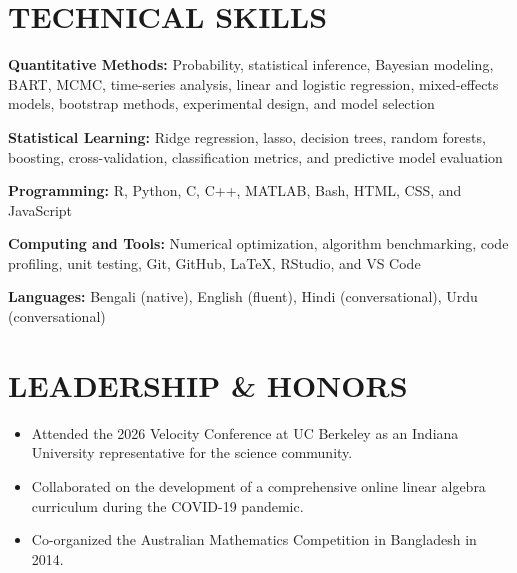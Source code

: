 \documentclass[10pt,letterpaper]{article}
\newenvironment{resumeItems}{%
	\begin{itemize}[
		label=\textbullet,
		leftmargin=14pt,
		labelsep=5pt,
		itemsep=0.5pt,
		topsep=1.0pt,
		parsep=0pt,
		partopsep=0pt
	]
}{%
	\end{itemize}
}
\begin{document}
\section*{TECHNICAL SKILLS}

\textbf{Quantitative Methods:}
Probability, statistical inference, Bayesian modeling, BART, MCMC, time-series analysis, linear and logistic regression, mixed-effects models, bootstrap methods, experimental design, and model selection

\textbf{Statistical Learning:}
Ridge regression, lasso, decision trees, random forests, boosting, cross-validation, classification metrics, and predictive model evaluation

\textbf{Programming:}
R, Python, C, C++, MATLAB, Bash, HTML, CSS, and JavaScript

\textbf{Computing and Tools:}
Numerical optimization, algorithm benchmarking, code profiling, unit testing, Git, GitHub, LaTeX, RStudio, and VS Code

\textbf{Languages:}
Bengali (native), English (fluent), Hindi (conversational), Urdu (conversational)

\section*{LEADERSHIP \& HONORS}

\begin{resumeItems}
	\item Attended the 2026 Velocity Conference at UC Berkeley as an Indiana University representative for the science community.

	\item Collaborated on the development of a comprehensive online linear algebra curriculum during the COVID-19 pandemic.

	\item Co-organized the Australian Mathematics Competition in Bangladesh in 2014.
\end{resumeItems}
\end{document}

